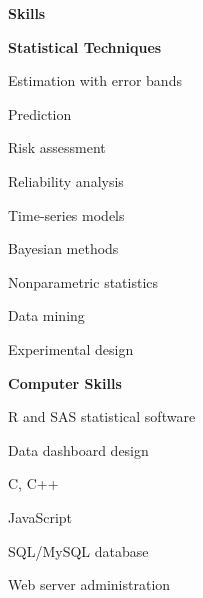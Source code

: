 \documentclass[letterpaper,12pt,final]{memoir}
\newcommand{\MedSep}{\vspace{1em}}
\newcommand{\SmallSep}{\vspace{0.5em}}
\newcommand{\CVSection}[1]
	{\Large\textbf{#1}\par
	\SmallSep\normalsize\normalfont}
\newcommand{\CVItem}[1]
	{\textbf{\color{RoyalBlue} #1}}
\begin{document}
\CVSection{Skills}
\CVItem{Statistical Techniques}
\begin{multicols}{3}
\begin{compactitem}[\color{RoyalBlue}$\bullet$]
	\item Estimation with error bands
  \item Prediction
	\item Risk assessment
  \item Reliability analysis
	\item Time-series models
	\item Bayesian methods
  \item Nonparametric statistics
	\item Data mining
	\item Experimental design
\end{compactitem}
\end{multicols}
\SmallSep
\CVItem{Computer Skills}
\begin{multicols}{3}
\begin{compactitem}[\color{RoyalBlue}$\bullet$]
	\item R and SAS statistical software
	\item Data dashboard design
	\item C, C++
	\item JavaScript
	\item SQL/MySQL database
  \item Web server administration
\end{compactitem}
\end{multicols}
\MedSep
\end{document}
